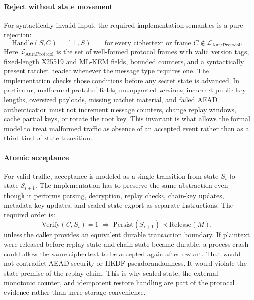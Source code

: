 \documentclass[preprint,12pt]{elsarticle}
\theoremstyle{definition}
\renewcommand{\mathsf}[1]{\mathrm{#1}}
\begin{document}
\paragraph{Reject without state movement}
For syntactically invalid input, the required implementation semantics is
a pure rejection:
\begin{equation}\label{eq:reject-no-state}
  \mathsf{Handle}(S, C) = (\bot, S)
  \qquad\text{for every ciphertext or frame } C \notin \mathcal{L}_{\mathrm{AuraProtocol}} .
\end{equation}
Here $\mathcal{L}_{\mathrm{AuraProtocol}}$ is the set of well-formed protocol
frames with valid version tags, fixed-length X25519 and ML-KEM fields,
bounded counters, and a syntactically present ratchet header whenever the
message type requires one. The implementation checks those conditions
before any secret state is advanced. In particular, malformed protobuf
fields, unsupported versions, incorrect public-key lengths, oversized
payloads, missing ratchet material, and failed AEAD authentication must
not increment message counters, change replay windows, cache partial
keys, or rotate the root key. This invariant is what allows the formal
model to treat malformed traffic as absence of an accepted event rather
than as a third kind of state transition.

\paragraph{Atomic acceptance}
For valid traffic, acceptance is modeled as a single transition from
state $S_i$ to state $S_{i+1}$. The implementation has to preserve the
same abstraction even though it performs parsing, decryption, replay
checks, chain-key updates, metadata-key updates, and sealed-state export
as separate instructions. The required order is:
\begin{equation}\label{eq:accept-atomic}
  \mathsf{Verify}(C,S_i)=1
  \;\Longrightarrow\;
  \mathsf{Persist}(S_{i+1}) \prec \mathsf{Release}(M),
\end{equation}
unless the caller provides an equivalent durable transaction boundary.
If plaintext were released before replay state and chain state became
durable, a process crash could allow the same ciphertext to be accepted
again after restart. That would not contradict AEAD security or HKDF
pseudorandomness. It would violate the state premise of the replay
claim. This is why sealed state, the external monotonic counter, and
idempotent restore handling are part of the protocol evidence rather than
mere storage convenience.
\end{document}
